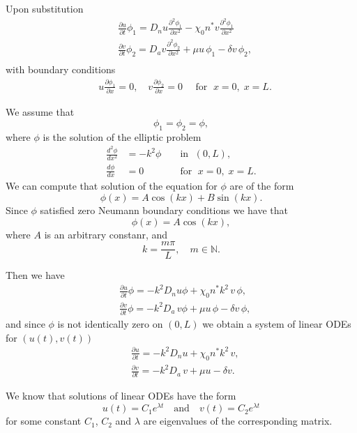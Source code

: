 \documentclass[
  letterpaper,
  DIV=11,
  numbers=noendperiod]{scrreprt}
\theoremstyle{plain}
\theoremstyle{definition}
\theoremstyle{plain}
\theoremstyle{remark}
\begin{document}
Upon substitution \[
\begin{aligned}
&\frac{\partial u}{\partial  t}  \phi_1  =   D_n  u\frac{\partial ^2 \phi_1}{\partial x^2} - \chi_0 n^*  v\frac{\partial ^2 \phi_1}{\partial x^2} \\
& \frac{\partial v}{\partial  t}  \phi_2=     D_a v \frac{\partial ^2  \phi_2}{\partial x^2}  +  \mu u \,  \phi_1 - \delta v\,  \phi_2, \\
\end{aligned}
\] with boundary conditions \[
\begin{aligned}
& u \frac{\partial \phi_1}{\partial x} = 0, \quad   v \frac{\partial \phi_2}{\partial x} = 0 \quad \text{ for } \; x = 0, \; x=L.
\end{aligned}
\]

We assume that\\
\[
\phi_1 = \phi_2 = \phi,
\] where \(\phi\) is the solution of the elliptic problem \[
\begin{aligned}
\frac{d^2 \phi}{dx^2} &= - k^2 \phi && \text{ in } \; (0,L), \\
\frac{d \phi}{dx} &= 0  && \text{ for } \; x=0, \; x=L. 
\end{aligned}
\] We can compute that solution of the equation for \(\phi\) are of the
form \[
\phi(x) = A \cos(kx) + B\sin(kx).
\] Since \(\phi\) satisfied zero Neumann boundary conditions we have
that \[
\phi(x) = A \cos(kx),
\] where \(A\) is an arbitrary constanr, and \[
k = \dfrac {m \pi} L, \quad m \in \mathbb N.
\]

Then we have \[
\begin{aligned}
&\frac{\partial u}{\partial  t}  \phi  =   - k^2 D_n  u \phi +  \chi_0 n^* k^2\,  v \, \phi,  \\
& \frac{\partial v}{\partial  t} \phi =   - k^2 D_a  \, v \phi  +  \mu u \,  \phi - \delta v\,  \phi, 
\end{aligned}
\] and since \(\phi\) is not identically zero on \((0,L)\) we obtain a
system of linear ODEs for \((u(t),v(t))\) \[
\begin{aligned}
&\frac{\partial u}{\partial  t}    =   - k^2 D_n  u  +  \chi_0 n^* k^2\,  v,  \\
& \frac{\partial v}{\partial  t} =   - k^2 D_a  \, v  +  \mu u  - \delta v. 
\end{aligned}
\]

We know that solutions of linear ODEs have the form \[
u(t) = C_1 e^{\lambda t} \quad \textrm{and} \quad v(t) = C_2 e^{\lambda t}
\] for some constant \(C_1\), \(C_2\) and \(\lambda\) are eigenvalues of
the corresponding matrix.
\end{document}
